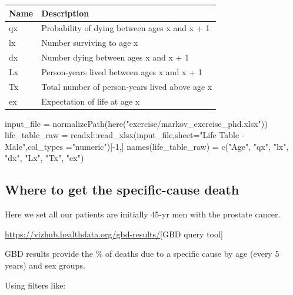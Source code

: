 \documentclass[
  letterpaper,
  DIV=11,
  numbers=noendperiod]{scrartcl}
\newenvironment{Shaded}{\begin{snugshade}}{\end{snugshade}}
\newcommand{\AttributeTok}[1]{\textcolor[rgb]{0.40,0.45,0.13}{#1}}
\newcommand{\DecValTok}[1]{\textcolor[rgb]{0.68,0.00,0.00}{#1}}
\newcommand{\FunctionTok}[1]{\textcolor[rgb]{0.28,0.35,0.67}{#1}}
\newcommand{\NormalTok}[1]{\textcolor[rgb]{0.00,0.23,0.31}{#1}}
\newcommand{\OtherTok}[1]{\textcolor[rgb]{0.00,0.23,0.31}{#1}}
\newcommand{\SpecialCharTok}[1]{\textcolor[rgb]{0.37,0.37,0.37}{#1}}
\newcommand{\StringTok}[1]{\textcolor[rgb]{0.13,0.47,0.30}{#1}}
\begin{document}
\begin{longtable}[]{@{}ll@{}}
\toprule()
Name & Description \\
\midrule()
\endhead
qx & Probability of dying between ages x and x + 1 \\
lx & Number surviving to age x \\
dx & Number dying between ages x and x + 1 \\
Lx & Person-years lived between ages x and x + 1 \\
Tx & Total number of person-years lived above age x \\
ex & Expectation of life at age x \\
\bottomrule()
\end{longtable}

\begin{Shaded}
\begin{Highlighting}[]
\NormalTok{input\_file }\OtherTok{=} \FunctionTok{normalizePath}\NormalTok{(}\FunctionTok{here}\NormalTok{(}\StringTok{"exercise/markov\_exercise\_phd.xlsx"}\NormalTok{))}
\NormalTok{life\_table\_raw }\OtherTok{=}\NormalTok{ readxl}\SpecialCharTok{::}\FunctionTok{read\_xlsx}\NormalTok{(input\_file,}\AttributeTok{sheet=}\StringTok{"Life Table {-} Male"}\NormalTok{,}\AttributeTok{col\_types =}\StringTok{"numeric"}\NormalTok{)[}\SpecialCharTok{{-}}\DecValTok{1}\NormalTok{,]}
\FunctionTok{names}\NormalTok{(life\_table\_raw) }\OtherTok{=} \FunctionTok{c}\NormalTok{(}\StringTok{"Age"}\NormalTok{, }\StringTok{"qx"}\NormalTok{, }\StringTok{"lx"}\NormalTok{, }\StringTok{"dx"}\NormalTok{, }\StringTok{"Lx"}\NormalTok{, }\StringTok{"Tx"}\NormalTok{, }\StringTok{"ex"}\NormalTok{)}
\end{Highlighting}
\end{Shaded}

\hypertarget{where-to-get-the-specific-cause-death}{%
\subsection{Where to get the specific-cause
death}\label{where-to-get-the-specific-cause-death}}

Here we set all our patients are initially 45-yr men with the prostate
cancer.

\url{https://vizhub.healthdata.org/gbd-results/}{[}GBD query tool{]}

GBD results provide the \% of deaths due to a specific cause by age
(every 5 years) and sex groups.

Using filters like:
\end{document}

